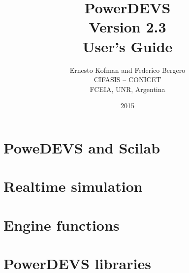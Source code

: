\documentclass[a4paper,12pt]{book}
\title{\Huge{\textbf{PowerDEVS}}\\ \vspace{1cm} \large{Version 2.3} \\ \vspace{1cm} \huge{User's Guide}\vspace{2cm}}
\author{ Ernesto Kofman and Federico Bergero\vspace{2cm} \\ CIFASIS -- CONICET\\FCEIA, UNR, Argentina}
\date{2015}
\begin{document}
 \maketitle

 \tableofcontents





%








\chapter{PoweDEVS and Scilab}

\chapter{Realtime simulation}

\appendix
\chapter{Engine functions}

\chapter{PowerDEVS libraries}
\end{document}
